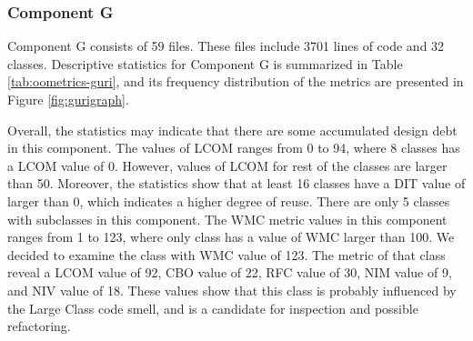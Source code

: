 



\subsubsection{Component G}
Component G consists of 59 files. These files include 3701 lines of code and 32 classes. Descriptive statistics for Component G is summarized in Table \ref{tab:oometrics-guri}, and its frequency distribution of the metrics are presented in Figure \ref{fig:gurigraph}. 

Overall, the statistics may indicate that there are some accumulated design debt in this component. The values of LCOM ranges from 0 to 94, where 8 classes has a LCOM value of 0. However, values of LCOM for rest of the classes are larger than 50. Moreover, the statistics show that at least 16 classes have a DIT value of larger than 0, which indicates a higher degree of reuse. There are only 5 classes with subclasses in this component. The WMC metric values in this component ranges from 1 to 123, where only class has a value of WMC larger than 100. We decided to examine the class with WMC value of 123. The metric of that class reveal a LCOM value of 92, CBO value of 22, RFC value of 30, NIM value of 9, and NIV value of 18. These values show that this class is probably influenced by the Large Class code smell, and is a candidate for inspection and possible refactoring.



